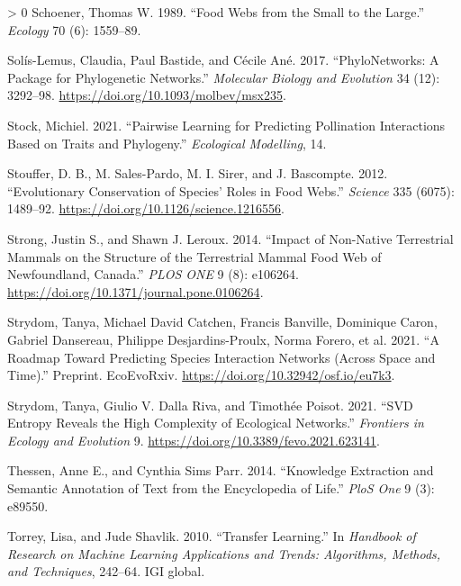 \documentclass[11pt]{article}
\newlength{\cslhangindent}
\newenvironment{CSLReferences}[3] %
 {%
  \setlength{\parindent}{0pt}
  \ifodd #1 \everypar{\setlength{\hangindent}{\cslhangindent}}\ignorespaces\fi
  \ifnum #2 > 0
  \setlength{\parskip}{#2\baselineskip}
  \fi
 }%
 {}
\begin{document}
\begin{CSLReferences}{1}{0}
\leavevmode\hypertarget{ref-Schoener1989FooWeb}{}%
Schoener, Thomas W. 1989. {``Food Webs from the Small to the Large.''}
\emph{Ecology} 70 (6): 1559--89.

\leavevmode\hypertarget{ref-Solis-Lemus2017PhyPac}{}%
Solís-Lemus, Claudia, Paul Bastide, and Cécile Ané. 2017.
{``PhyloNetworks: A Package for Phylogenetic Networks.''}
\emph{Molecular Biology and Evolution} 34 (12): 3292--98.
\url{https://doi.org/10.1093/molbev/msx235}.

\leavevmode\hypertarget{ref-Stock2021PaiLea}{}%
Stock, Michiel. 2021. {``Pairwise Learning for Predicting Pollination
Interactions Based on Traits and Phylogeny.''} \emph{Ecological
Modelling}, 14.

\leavevmode\hypertarget{ref-Stouffer2012EvoCon}{}%
Stouffer, D. B., M. Sales-Pardo, M. I. Sirer, and J. Bascompte. 2012.
{``Evolutionary Conservation of Species' Roles in Food Webs.''}
\emph{Science} 335 (6075): 1489--92.
\url{https://doi.org/10.1126/science.1216556}.

\leavevmode\hypertarget{ref-Strong2014ImpNon}{}%
Strong, Justin S., and Shawn J. Leroux. 2014. {``Impact of Non-Native
Terrestrial Mammals on the Structure of the Terrestrial Mammal Food Web
of Newfoundland, Canada.''} \emph{PLOS ONE} 9 (8): e106264.
\url{https://doi.org/10.1371/journal.pone.0106264}.

\leavevmode\hypertarget{ref-Strydom2021RoaPre}{}%
Strydom, Tanya, Michael David Catchen, Francis Banville, Dominique
Caron, Gabriel Dansereau, Philippe Desjardins-Proulx, Norma Forero, et
al. 2021. {``A Roadmap Toward Predicting Species Interaction Networks
(Across Space and Time).''} Preprint. EcoEvoRxiv.
\url{https://doi.org/10.32942/osf.io/eu7k3}.

\leavevmode\hypertarget{ref-Strydom2021SvdEnt}{}%
Strydom, Tanya, Giulio V. Dalla Riva, and Timothée Poisot. 2021. {``SVD
Entropy Reveals the High Complexity of Ecological Networks.''}
\emph{Frontiers in Ecology and Evolution} 9.
\url{https://doi.org/10.3389/fevo.2021.623141}.

\leavevmode\hypertarget{ref-Thessen2014KnoExt}{}%
Thessen, Anne E., and Cynthia Sims Parr. 2014. {``Knowledge Extraction
and Semantic Annotation of Text from the Encyclopedia of Life.''}
\emph{PloS One} 9 (3): e89550.

\leavevmode\hypertarget{ref-Torrey2010TraLea}{}%
Torrey, Lisa, and Jude Shavlik. 2010. {``Transfer Learning.''} In
\emph{Handbook of Research on Machine Learning Applications and Trends:
Algorithms, Methods, and Techniques}, 242--64. IGI global.


\end{CSLReferences}
\end{document}
